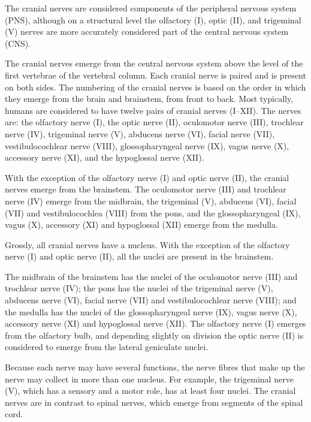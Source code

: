 The cranial nerves are considered components of the peripheral nervous system (PNS), although on a structural level the olfactory (I), optic (II), and trigeminal (V) nerves are more accurately considered part of the central nervous system (CNS).

The cranial nerves emerge from the central nervous system above the level of the first vertebrae of the vertebral column. Each cranial nerve is paired and is present on both sides. The numbering of the cranial nerves is based on the order in which they emerge from the brain and brainstem, from front to back. Most typically, humans are considered to have twelve pairs of cranial nerves (I--XII). The nerves are: the olfactory nerve (I), the optic nerve (II), oculomotor nerve (III), trochlear nerve (IV), trigeminal nerve (V), abducens nerve (VI), facial nerve (VII), vestibulocochlear nerve (VIII), glossopharyngeal nerve (IX), vagus nerve (X), accessory nerve (XI), and the hypoglossal nerve (XII).

With the exception of the olfactory nerve (I) and optic nerve (II), the cranial nerves emerge from the brainstem. The oculomotor nerve (III) and trochlear nerve (IV) emerge from the midbrain, the trigeminal (V), abducens (VI), facial (VII) and vestibulocochlea (VIII) from the pons, and the glossopharyngeal (IX), vagus (X), accessory (XI) and hypoglossal (XII) emerge from the medulla.

Grossly, all cranial nerves have a nucleus. With the exception of the olfactory nerve (I) and optic nerve (II), all the nuclei are present in the brainstem.

The midbrain of the brainstem has the nuclei of the oculomotor nerve (III) and trochlear nerve (IV); the pons has the nuclei of the trigeminal nerve (V), abducens nerve (VI), facial nerve (VII) and vestibulocochlear nerve (VIII); and the medulla has the nuclei of the glossopharyngeal nerve (IX), vagus nerve (X), accessory nerve (XI) and hypoglossal nerve (XII). The olfactory nerve (I) emerges from the olfactory bulb, and depending slightly on division the optic nerve (II) is considered to emerge from the lateral geniculate nuclei.

Because each nerve may have several functions, the nerve fibres that make up the nerve may collect in more than one nucleus. For example, the trigeminal nerve (V), which has a sensory and a motor role, has at least four nuclei.
The cranial nerves are in contrast to spinal nerves, which emerge from segments of the spinal cord.


